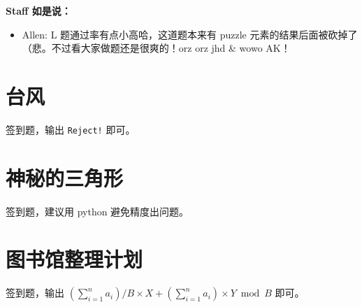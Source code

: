 \documentclass[14pt,a4paper]{article}
\begin{document}
{ \Large \bfseries Staff 如是说：}
\begin{itemize}
    \item Allen: L 题通过率有点小高哈，这道题本来有 puzzle 元素的结果后面被砍掉了（悲。不过看大家做题还是很爽的！orz orz jhd \& wowo AK！
\end{itemize}
\clearpage

\section{台风}
签到题，输出 \texttt{Reject!} 即可。

\section{神秘的三角形}
签到题，建议用 python 避免精度出问题。

\section{图书馆整理计划}
签到题，输出 $\left(\sum_{i=1}^{n} a_i\right)/B\times X + \left(\sum_{i=1}^{n} a_i\right) \times Y \bmod B $ 即可。
\end{document}
